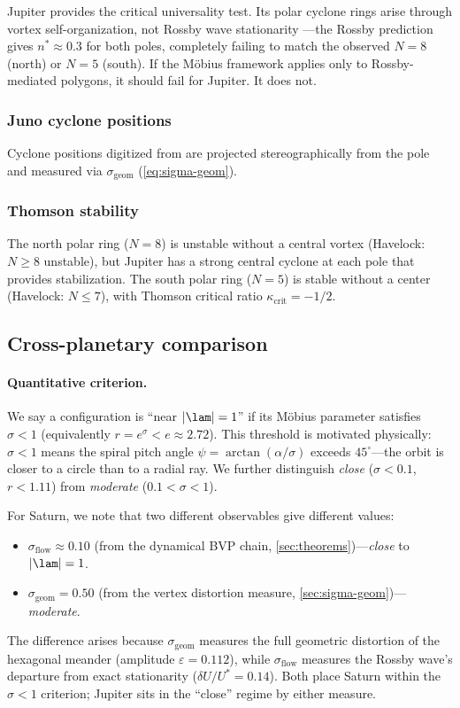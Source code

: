 Jupiter provides the critical universality test.  Its polar cyclone
rings arise through vortex self-organization, not Rossby wave stationarity
---the Rossby prediction gives $n^* \approx 0.3$ for both poles,
completely failing to match the observed $N = 8$ (north) or $N = 5$
(south).  If the M\"obius framework applies only to Rossby-mediated
polygons, it should fail for Jupiter.  It does not.

\subsubsection{Juno cyclone positions}

Cyclone positions digitized from \citet{Adriani2018} are projected
stereographically from the pole and measured via
$\sigma_{\mathrm{geom}}$ (\cref{eq:sigma-geom}).

\subsubsection{Thomson stability}

The north polar ring ($N = 8$) is unstable without a central vortex
(Havelock: $N \ge 8$ unstable), but Jupiter has a strong central cyclone
at each pole that provides stabilization.  The south polar ring ($N = 5$)
is stable without a center (Havelock: $N \le 7$), with Thomson critical
ratio $\kappa_{\mathrm{crit}} = -1/2$.

\subsection{Cross-planetary comparison}

\paragraph{Quantitative criterion.}
We say a configuration is ``near $|\lam| = 1$'' if its M\"obius parameter
satisfies $\sigma < 1$ (equivalently $r = e^\sigma < e \approx 2.72$).
This threshold is motivated physically: $\sigma < 1$ means the spiral
pitch angle $\psi = \arctan(\alpha/\sigma)$ exceeds $45^\circ$---the
orbit is closer to a circle than to a radial ray.  We further distinguish
\emph{close} ($\sigma < 0.1$, $r < 1.11$) from \emph{moderate}
($0.1 < \sigma < 1$).

For Saturn, we note that two different observables give different values:
\begin{itemize}
  \item $\sigma_{\mathrm{flow}} \approx 0.10$ (from the dynamical BVP
    chain, \cref{sec:theorems})---\emph{close} to $|\lam| = 1$.
  \item $\sigma_{\mathrm{geom}} = 0.50$ (from the vertex distortion
    measure, \cref{sec:sigma-geom})---\emph{moderate}.
\end{itemize}
The difference arises because $\sigma_{\mathrm{geom}}$ measures the
full geometric distortion of the hexagonal meander (amplitude
$\varepsilon = 0.112$), while $\sigma_{\mathrm{flow}}$ measures the
Rossby wave's departure from exact stationarity ($\delta U/U^* = 0.14$).
Both place Saturn within the $\sigma < 1$ criterion; Jupiter sits in
the ``close'' regime by either measure.

